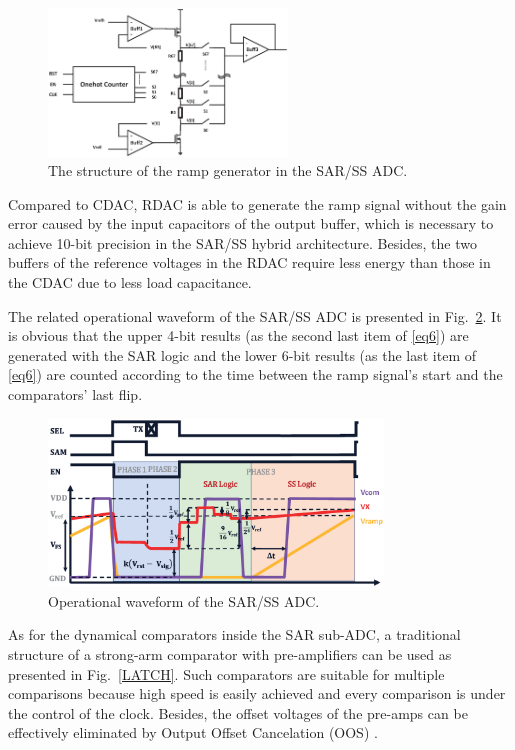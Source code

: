 \begin{figure}[htbp] 
	\centerline{\includegraphics[width=2.5in]{./Figures/RRAMP.eps}}
	\caption{The structure of the ramp generator in the SAR/SS ADC.}
	\label{RRAMP}
\end{figure}

Compared to CDAC, RDAC is able to generate the ramp signal without the gain error caused by the input capacitors of the output buffer, 
which is necessary to achieve 10-bit precision in the SAR/SS hybrid architecture.
Besides, the two buffers of the reference voltages in the RDAC require less energy than those in the CDAC due to less load capacitance.  

The related operational waveform of the SAR/SS ADC is presented in Fig.~\ref{SARWAVE}. It is obvious that the upper 4-bit results (as the second last item of \eqref{eq6}) are generated 
with the SAR logic and the lower 6-bit results (as the last item of \eqref{eq6}) are counted according to the time between the ramp signal’s start and the comparators’ last flip. 

\begin{figure}[htbp]
	\centerline{\includegraphics[width=3.5in]{./Figures/SARWAVE.eps}}
	\caption{Operational waveform of the SAR/SS ADC.}
	\label{SARWAVE}
\end{figure} 

As for the dynamical comparators inside the SAR sub-ADC, a traditional structure of a strong-arm comparator with pre-amplifiers can be used as presented in Fig.~\ref{LATCH}. Such comparators 
are suitable for multiple comparisons because high speed is easily achieved and every comparison is under the control of the clock. Besides, the offset voltages of the pre-amps can be effectively eliminated by Output Offset Cancelation (OOS) \cite{razavi_design_1992}.

